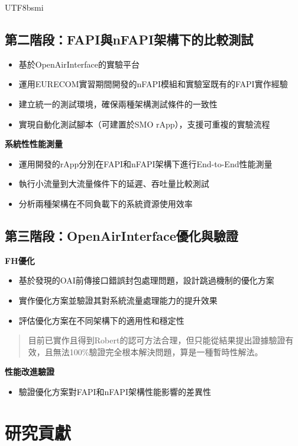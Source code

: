 \documentclass[conference]{IEEEtran}
\begin{document}
\begin{CJK}{UTF8}{bsmi}
{\subsection{第二階段：FAPI與nFAPI架構下的比較測試}
\begin{itemize}
    \item 基於OpenAirInterface的實驗平台
    \item 運用EURECOM實習期間開發的nFAPI模組和實驗室既有的FAPI實作經驗
    \item 建立統一的測試環境，確保兩種架構測試條件的一致性
    \item 實現自動化測試腳本（可建置於SMO rApp），支援可重複的實驗流程
\end{itemize}

\textbf{系統性性能測量}
\begin{itemize}
    \item 運用開發的rApp分別在FAPI和nFAPI架構下進行End-to-End性能測量
    \item 執行小流量到大流量條件下的延遲、吞吐量比較測試
    \item 分析兩種架構在不同負載下的系統資源使用效率
\end{itemize}

\subsection{第三階段：OpenAirInterface優化與驗證}
\textbf{FH優化}
\begin{itemize}
    \item [暫定] 基於發現的OAI前傳接口錯誤封包處理問題，設計跳過機制的優化方案
    \item [暫定] 實作優化方案並驗證其對系統流量處理能力的提升效果
    \item [暫定] 評估優化方案在不同架構下的適用性和穩定性
\end{itemize}

\begin{quote}
目前已實作且得到Robert的認可方法合理，但只能從結果提出證據驗證有效，且無法100\%驗證完全根本解決問題，算是一種暫時性解法。
\end{quote}

\textbf{性能改進驗證}
\begin{itemize}
    \item 驗證優化方案對FAPI和nFAPI架構性能影響的差異性
\end{itemize}

\section{研究貢獻}

}
\end{CJK}
\end{document}
